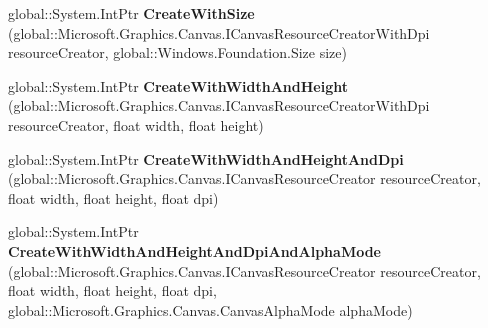 \begin{DoxyCompactItemize}
\item 
\mbox{\label{interface_microsoft_1_1_graphics_1_1_canvas_1_1_u_i_1_1_xaml_1_1_i_canvas_virtual_image_source_factory_a6ef2ceb8efc3356922c19a0c886c01a9}} 
global\+::\+System.\+Int\+Ptr {\bfseries Create\+With\+Size} (global\+::\+Microsoft.\+Graphics.\+Canvas.\+I\+Canvas\+Resource\+Creator\+With\+Dpi resource\+Creator, global\+::\+Windows.\+Foundation.\+Size size)
\item 
\mbox{\label{interface_microsoft_1_1_graphics_1_1_canvas_1_1_u_i_1_1_xaml_1_1_i_canvas_virtual_image_source_factory_a5ce3deeb7f455cd4077cd79f1a73628d}} 
global\+::\+System.\+Int\+Ptr {\bfseries Create\+With\+Width\+And\+Height} (global\+::\+Microsoft.\+Graphics.\+Canvas.\+I\+Canvas\+Resource\+Creator\+With\+Dpi resource\+Creator, float width, float height)
\item 
\mbox{\label{interface_microsoft_1_1_graphics_1_1_canvas_1_1_u_i_1_1_xaml_1_1_i_canvas_virtual_image_source_factory_a8dec48ae093e81783bc8f960229a0cd0}} 
global\+::\+System.\+Int\+Ptr {\bfseries Create\+With\+Width\+And\+Height\+And\+Dpi} (global\+::\+Microsoft.\+Graphics.\+Canvas.\+I\+Canvas\+Resource\+Creator resource\+Creator, float width, float height, float dpi)
\item 
\mbox{\label{interface_microsoft_1_1_graphics_1_1_canvas_1_1_u_i_1_1_xaml_1_1_i_canvas_virtual_image_source_factory_ac23a6e94d90c7e30a156e1261f94f38c}} 
global\+::\+System.\+Int\+Ptr {\bfseries Create\+With\+Width\+And\+Height\+And\+Dpi\+And\+Alpha\+Mode} (global\+::\+Microsoft.\+Graphics.\+Canvas.\+I\+Canvas\+Resource\+Creator resource\+Creator, float width, float height, float dpi, global\+::\+Microsoft.\+Graphics.\+Canvas.\+Canvas\+Alpha\+Mode alpha\+Mode)
\item 
\mbox{\label{interface_microsoft_1_1_graphics_1_1_canvas_1_1_u_i_1_1_xaml_1_1_i_canvas_virtual_image_source_factory_a6ef2ceb8efc3356922c19a0c886c01a9}} 

\end{DoxyCompactItemize}
